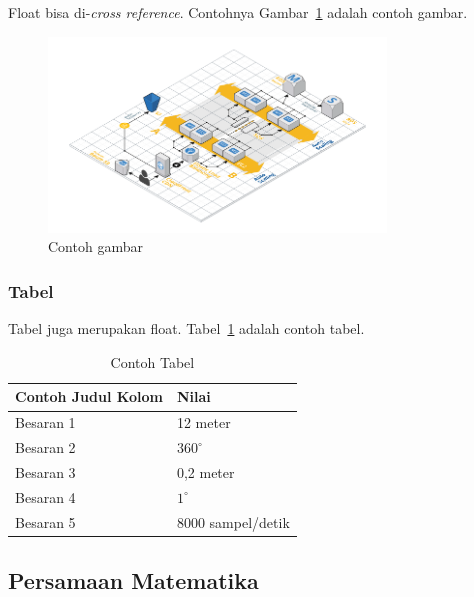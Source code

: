     Float bisa di-\textit{cross reference}. Contohnya Gambar~\ref{fig:contoh_gambar} adalah contoh gambar.

    \begin{figure}[ht]
        \centering
        \includegraphics[width=0.8\textwidth]{resources/chapter-2-infrastructure-diagram.png}
        \caption{Contoh gambar}
        \label{fig:contoh_gambar}
    \end{figure}

    \subsubsection{Tabel}

    Tabel juga merupakan float. Tabel~\ref{table:contoh_tabel} adalah contoh tabel.

    \begin{table}[htbp]
        \small
        \centering
        \caption{Contoh Tabel}
        \label{table:contoh_tabel}
        \begin{tabular}{ll}
            \toprule
            \multicolumn{1}{l}{\textbf{Contoh Judul Kolom}} & \multicolumn{1}{l}{\textbf{Nilai}}\\
            \midrule
            Besaran 1 & 12 meter          \\
            Besaran 2 & $360^\circ$       \\
            Besaran 3 & 0,2 meter         \\
            Besaran 4 & $1^\circ$         \\
            Besaran 5 & 8000 sampel/detik \\
            \bottomrule
        \end{tabular}
    \end{table}

    \subsection{Persamaan Matematika}


